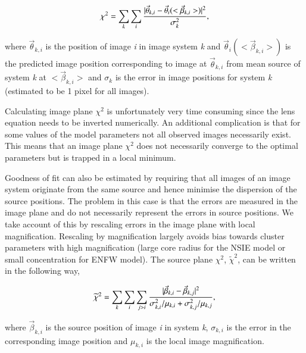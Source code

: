 \documentclass[useAMS,usenatbib]{mn2e}
\begin{document}
\begin{center}
  \begin{equation}
    {\chi}^{2}=\sum_{k}\sum_{i}{|\vec\theta_{k,i}-\vec\theta_{i}(<\vec\beta_{k,i}>)|^2
      \over \sigma_k^2},
  \end{equation}
\end{center}

where $\vec{\theta}_{k,i}$ is the position of image \textit{i} in
image system \textit{k} and $\vec{\theta}_{i}(<\vec\beta_{k,i}>)$ is
the predicted image position corresponding to image at
$\vec{\theta}_{k,i}$ from mean source of system \textit{k} at
$<\vec{\beta}_{k,i}>$ and $\sigma_k$ is the error in image positions
for system \textit{k} (estimated to be 1 pixel for all images).

Calculating image plane $\chi^2$ is unfortunately very time consuming
since the lens equation needs to be inverted numerically. An
additional complication is that for some values of the model
parameters not all observed images necessarily exist. This means that
an image plane $\chi^2$ does not necessarily converge to the optimal
parameters but is trapped in a local minimum.

Goodness of fit can also be estimated by requiring that all images of
an image system originate from the same source and hence minimise the
dispersion of the source positions. The problem in this case is that
the errors are measured in the image plane and do not necessarily
represent the errors in source positions. We take account of this by
rescaling errors in the image plane with local
magnification. Rescaling by magnification largely avoids bias towards
cluster parameters with high magnification (large core radius for the
NSIE model or small concentration for ENFW model). The source plane
$\chi^2$, $\widetilde{\chi}^2$, can be written in the following way,

\begin{center}
  \begin{equation}
    \widetilde{\chi}^{2}=\sum_{k}\sum_{i}\sum_{j>i}{|\vec\beta_{k,i}-\vec\beta_{k,j}|^2
      \over \sigma_{k,i}^2/\mu_{k,i}+\sigma_{k,j}^2/\mu_{k,j}},
    \label{eqn:source_chi2}
  \end{equation}
\end{center}

where $\vec\beta_{k,i}$ is the source position of image \textit{i} in
system \textit{k}, $\sigma_{k,i}$ is the error in the corresponding
image position and $\mu_{k,i}$ is the local image magnification.
\end{document}
